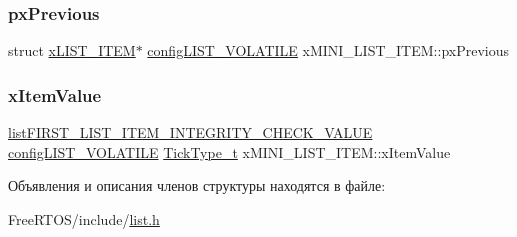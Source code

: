 \mbox{\label{structx_m_i_n_i___l_i_s_t___i_t_e_m_a732c666bb97560eb1b094a2c411269ab}} 
\subsubsection{\texorpdfstring{pxPrevious}{pxPrevious}}
{\footnotesize\ttfamily struct \mbox{\hyperlink{structx_l_i_s_t___i_t_e_m}{x\+L\+I\+S\+T\+\_\+\+I\+T\+EM}}$\ast$ \mbox{\hyperlink{list_8h_a2d5de557c5561c8980d1bf51d87d8cba}{config\+L\+I\+S\+T\+\_\+\+V\+O\+L\+A\+T\+I\+LE}} x\+M\+I\+N\+I\+\_\+\+L\+I\+S\+T\+\_\+\+I\+T\+E\+M\+::px\+Previous}

\mbox{\label{structx_m_i_n_i___l_i_s_t___i_t_e_m_aae79c54ac1efa30959e68604cc23b29e}} 
\subsubsection{\texorpdfstring{xItemValue}{xItemValue}}
{\footnotesize\ttfamily \mbox{\hyperlink{list_8h_a3611bd5d5d87cb26ac1dc7a4852b94a0}{list\+F\+I\+R\+S\+T\+\_\+\+L\+I\+S\+T\+\_\+\+I\+T\+E\+M\+\_\+\+I\+N\+T\+E\+G\+R\+I\+T\+Y\+\_\+\+C\+H\+E\+C\+K\+\_\+\+V\+A\+L\+UE}} \mbox{\hyperlink{list_8h_a2d5de557c5561c8980d1bf51d87d8cba}{config\+L\+I\+S\+T\+\_\+\+V\+O\+L\+A\+T\+I\+LE}} \mbox{\hyperlink{portmacro_8h_aa69c48c6e902ce54f70886e6573c92a9}{Tick\+Type\+\_\+t}} x\+M\+I\+N\+I\+\_\+\+L\+I\+S\+T\+\_\+\+I\+T\+E\+M\+::x\+Item\+Value}



Объявления и описания членов структуры находятся в файле\+:\begin{DoxyCompactItemize}
\item 
Free\+R\+T\+O\+S/include/\mbox{\hyperlink{list_8h}{list.\+h}}\end{DoxyCompactItemize}
